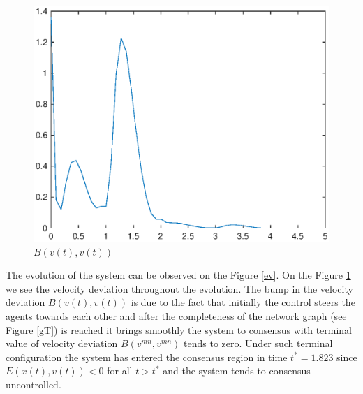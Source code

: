 \documentclass[a4paper,10pt, english]{article}
\begin{document}
 
 \begin{figure}[ht]
 \centering
 \includegraphics[scale=0.5]{figures/a5_D_lf.eps}
 \caption{$B(v(t), v(t))$}
 \label{lf}
 \end{figure}
  \newpage
The evolution of the system can be observed on the Figure \ref{ev}. On the Figure \ref{lf} we see the velocity deviation throughout the evolution. The bump in the velocity deviation $B(v(t), v(t))$
is due to the fact that initially the control steers the agents towards each other and after the completeness of the network graph (see Figure \ref{gT}) is reached it brings smoothly the system to consensus with terminal value of velocity deviation $B(v^{mn}, v^{mn})$ tends to zero. Under such terminal configuration the system has entered the consensus region in time  $t^* = 1.823$ since  $E(x(t), v(t)) < 0$ for all $t>t^{*}$ and the system tends to consensus uncontrolled.
\end{document}
